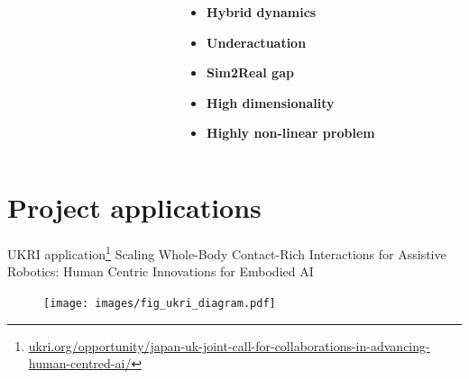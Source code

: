 \documentclass[aspectratio=169]{beamer}
\begin{document}
\begin{frame}[t]
  \begin{columns}[T]
    \begin{column}{0.55\textwidth}
      \centering
      \begin{figure}
        
      \end{figure}
    \end{column}
    \begin{column}{0.45\textwidth}
      \begin{itemize}
        \item \textbf{Hybrid dynamics}
        \item \textbf{Underactuation}
        \item \textbf{Sim2Real gap}
        \item \textbf{High dimensionality}
        \item \textbf{Highly non-linear problem}
      \end{itemize}
    \end{column}
  \end{columns}
\end{frame}

\section{Project applications}

\begin{frame}{
  UKRI application\footnote{\href{https://www.ukri.org/opportunity/japan-uk-joint-call-for-collaborations-in-advancing-human-centred-ai/}{ukri.org/opportunity/japan-uk-joint-call-for-collaborations-in-advancing-human-centred-ai/}}
  }{Scaling Whole-Body Contact-Rich Interactions for Assistive Robotics: Human Centric Innovations for Embodied AI}
  \begin{center}
    \begin{figure}
      \texttt{[image: images/fig\_ukri\_diagram.pdf]}
    \end{figure}
  \end{center}
\end{frame}

\begin{frame}
  \maketitle
\end{frame}
\end{document}
